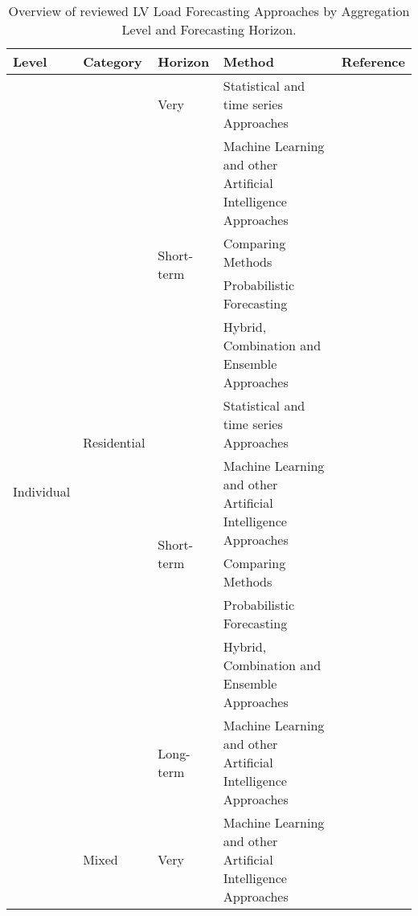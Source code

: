 \begin{table}[]
	\scriptsize
	\caption{Overview of reviewed LV Load Forecasting Approaches by Aggregation Level and Forecasting Horizon.} \label{tab:methodoverview}
	\begin{tabular}{p{.06\linewidth}p{.08\linewidth}p{.08\linewidth}p{.46\linewidth}p{.29\linewidth}}
		\toprule
		\textbf{Level} & \textbf{Category} & \textbf{Horizon} & \textbf{Method} & \textbf{Reference} \\ 
		\midrule
		\multirow[t]{32}{*}{Individual} & \multirow[t]{11}{*}{Residential} & \multirow[t]{1}{*}{Very} & Statistical and time series Approaches & \cite{Ghofrani2011smb} \\
		&  & \multirow[t]{4}{*}{Short-term} & Machine Learning and other Artificial   Intelligence Approaches & \cite{Singh2018bdm, mehdipour2020slf, liu2019tsh, estebsari2020srl, kong2017str, Elvers2019spl, voss2018residential, voss2018adjusted} \\
		&  &  & Comparing Methods & \cite{Cordova2019cet, Cerquitelli2019esm, nawaz2019aaf, Humeau2013elf} \\
		&  &  & Probabilistic Forecasting & \cite{wang2019pil, yang2020bdl, wang2019pil} \\
		&  &  & Hybrid, Combination and Ensemble   Approaches & \cite{dong2016ahm, ai2019hpd} \\
		&  & \multirow[t]{5}{*}{Short-term} & Statistical and time series Approaches & \cite{kipping2016mad, Litjens2018aof, Arora2016fes, Chaouch2014cio, dinesh2020rpf, Nugraha2018ldp} \\
		&  &  & Machine Learning and other Artificial   Intelligence Approaches & \cite{Singh2018bdm, sousa2012atr, bessani2020mhv, shah2020stm, Elvers2019spl, Shi2017dlf, voss2018residential, Haben2014ane, voss2018adjusted} \\
		&  &  & Comparing Methods & \cite{Cordova2019cet, nawaz2019aaf, gajowniczek2014ste, Humeau2013elf} \\
		&  &  & Probabilistic Forecasting & \cite{Arora2016fes, Arora2016fes, pinto2017mpf, gerossier2018rda} \\
		&  &  & Hybrid, Combination and Ensemble   Approaches & \cite{dong2016ahm, Kiguchi2019pil} \\
		&  & Long-term & Machine Learning and other Artificial Intelligence Approaches & \cite{Singh2018bdm} \\
		\cmidrule(lr){2-5}
		& \multirow[t]{11}{*}{Mixed} & \multirow[t]{1}{*}{Very} & Machine Learning and other Artificial Intelligence Approaches & \cite{Hosein2017lfu, desilva2011ipc} \\

\end{tabular}
\end{table}
